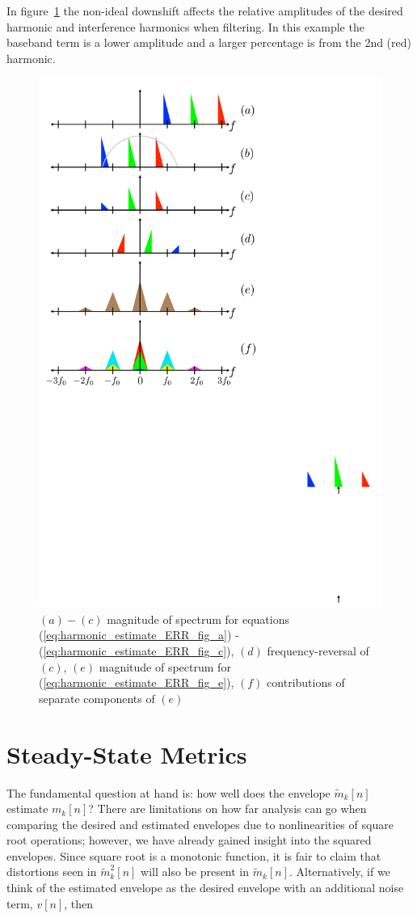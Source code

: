 \documentclass [11pt, proquest,oneside] {ganter_thesis}[2015/03/03]
\begin{document}
In figure~\ref{fig:downshift_effects} the non-ideal downshift affects the relative amplitudes of the desired harmonic and interference harmonics when filtering.  In this example the baseband term is a lower amplitude and a larger percentage is from the 2nd (red) harmonic.

\begin{figure}[!ht]
  \centering
    \includegraphics[width=.62\textwidth]{downshift_effects} 
    \caption{$(a)-(c)$ magnitude of spectrum for equations (\ref{eq:harmonic_estimate_ERR_fig_a}) - (\ref{eq:harmonic_estimate_ERR_fig_c}), $(d)$ frequency-reversal of $(c)$, $(e)$ magnitude of spectrum for (\ref{eq:harmonic_estimate_ERR_fig_e}), $(f)$ contributions of separate components of $(e)$}\label{fig:downshift_effects}
\end{figure}

\clearpage

\section{Steady-State Metrics}

The fundamental question at hand is: how well does the envelope $\tilde{m}_k[n]$ estimate $m_k[n]$?  There are limitations on how far analysis can go when comparing the desired and estimated envelopes due to nonlinearities of square root operations; however, we have already gained insight into the squared envelopes.  Since square root is a monotonic function, it is fair to claim that distortions seen in 
$\tilde{m}_k^2[n]$ will also be present in $\tilde{m}_k[n]$.  Alternatively, if we think of the estimated envelope as the desired envelope with an additional noise term, $v[n]$, then
\end{document}
